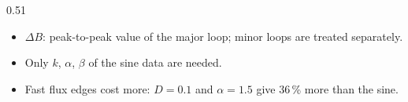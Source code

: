 \begin{frame}
\begin{columns}[T]
\begin{column}{0.51\textwidth}
\begin{equation*}
			\end{equation*}
			\begin{itemize}
				\item $\Delta B$: peak-to-peak value of the major loop; minor loops are treated separately.
				\item Only $k$, $\alpha$, $\beta$ of the sine data are needed.
				\item Fast flux edges cost more: $D=0.1$ and $\alpha=1.5$ give 36\,\% more than the sine.
			\end{itemize}
		\end{column}
	\end{columns}
\end{frame}

